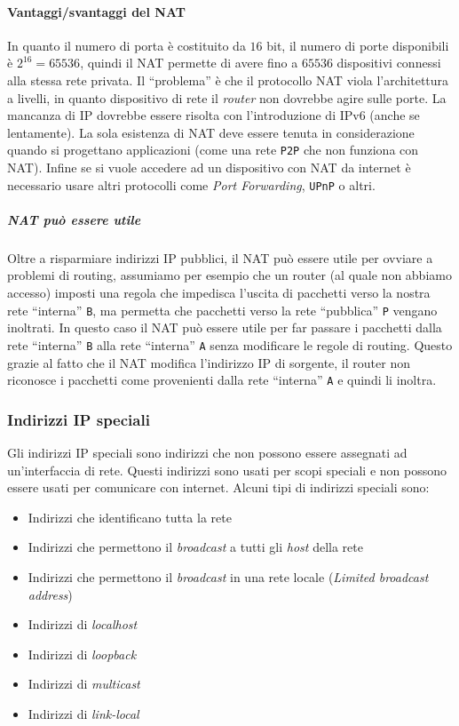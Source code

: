             \paragraph{Vantaggi/svantaggi del \Acrshort*{NAT}} In quanto il numero di porta è costituito da $16$ bit, il numero di porte disponibili è $2^{16}=65536$, quindi il \Acrshort*{NAT} permette di avere fino a $65536$ dispositivi connessi alla stessa rete privata. Il ``problema'' è che il protocollo \Acrshort*{NAT} viola l'architettura a livelli, in quanto dispositivo di rete il \textit{router} non dovrebbe agire sulle porte. La mancanza di \Acrshort*{IP} dovrebbe essere risolta con l'introduzione di \Acrshort*{IPv6} (anche se lentamente). La sola esistenza di \Acrshort*{NAT} deve essere tenuta in considerazione quando si progettano applicazioni (come una rete \texttt{P2P} che non funziona con \Acrshort*{NAT}). Infine se si vuole accedere ad un dispositivo con \Acrshort*{NAT} da internet è necessario usare altri protocolli come \textit{Port Forwarding}, \texttt{UPnP} o altri.
            \subparagraph{\Acrshort*{NAT} può essere utile} Oltre a risparmiare indirizzi \Acrshort*{IP} pubblici, il \Acrshort*{NAT} può essere utile per ovviare a problemi di routing, assumiamo per esempio che un router (al quale non abbiamo accesso) imposti una regola che impedisca l'uscita di pacchetti verso la nostra rete ``interna'' \texttt{B}, ma permetta che pacchetti verso la rete ``pubblica'' \texttt{P} vengano inoltrati. In questo caso il \Acrshort*{NAT} può essere utile per far passare i pacchetti dalla rete ``interna'' \texttt{B} alla rete ``interna'' \texttt{A} senza modificare le regole di routing. Questo grazie al fatto che il \Acrshort*{NAT} modifica l'indirizzo \Acrshort*{IP} di sorgente, il router non riconosce i pacchetti come provenienti dalla rete ``interna'' \texttt{A} e quindi li inoltra.
        \subsubsection{Indirizzi \Acrshort*{IP} speciali}
            Gli indirizzi \Acrshort*{IP} speciali sono indirizzi che non possono essere assegnati ad un'interfaccia di rete. Questi indirizzi sono usati per scopi speciali e non possono essere usati per comunicare con internet. Alcuni tipi di indirizzi speciali sono: \begin{itemize}
                \item Indirizzi che identificano tutta la rete
                \item Indirizzi che permettono il \textit{broadcast} a tutti gli \textit{host} della rete
                \item Indirizzi che permettono il \textit{broadcast} in una rete locale (\textit{Limited broadcast address})
                \item Indirizzi di \textit{localhost}
                \item Indirizzi di \textit{loopback}
                \item Indirizzi di \textit{multicast}
                \item Indirizzi di \textit{link-local}
            \end{itemize}
